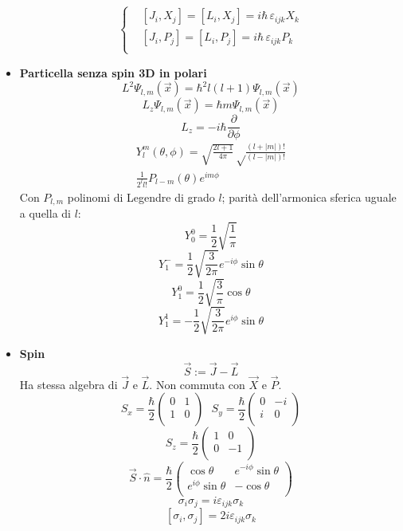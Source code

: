 \documentclass{article}
\begin{document}
\begin{small}
\begin{multicols*}{3}
\begin{itemize}[leftmargin=*]
		\[
			\left\{\begin{aligned}
				&\left[J_i, X_j\right] = \left[L_i,X_j\right] = i\hbar \,\varepsilon _{ijk} X_k\\
				&\left[J_i, P_j\right] = \left[L_i,P_j\right] = i\hbar \,\varepsilon _{ijk} P_k\\
			\end{aligned}\right.
		\]
	\item \textbf{Particella senza spin 3D in polari}
		\[L^2 \Psi _{l,m}(\vec{x}) = \hbar ^2 l(l+1) \Psi _{l,m}(\vec{x})\]
		\[L_z \Psi _{l,m}(\vec{x}) = \hbar m \Psi _{l,m}(\vec{x})\]
		\[L_z = -i\hbar \frac{\partial}{\partial \phi }\]
		\begin{align*}Y_l^m(\theta ,\phi ) = \sqrt{\frac{2l+1}{4\pi }}\sqrt\frac{(l+|m|)!}{\left(l-|m|\right)!}\\\frac{1}{2^ll!}P_{l-m}(\theta ) e^{im\phi }\end{align*}
		Con $P_{l,m}$ polinomi di Legendre di grado $l$; parità dell'armonica sferica uguale a quella di $l$:
		\[Y_0^0 = \frac{1}{2}\sqrt{\frac{1}{\pi }}\]
		\[Y_1^- = \frac{1}{2}\sqrt{\frac{3}{2\pi }}e^{-i\phi }\sin\theta \]
		\[Y_1^0 = \frac{1}{2}\sqrt{\frac{3}{\pi }}\cos\theta \]
		\[Y_1^1 = -\frac{1}{2}\sqrt{\frac{3}{2\pi }} e^{i\phi }\sin\theta \]
	\item \textbf{Spin}
		\[\vec{S} := \vec{J}-\vec{L}\]
		Ha stessa algebra di $\vec{J}$ e $\vec{L}$. Non commuta con $\vec{X}$ e $\vec{P}$.
		\[S_x = \frac{\hbar }{2}
			\begin{pmatrix}
				0&1\\
				1&0\\
			\end{pmatrix}
			\hspace{8pt}
		S_y = \frac{\hbar }{2}
			\begin{pmatrix}
				0&-i\\
				i&0\\
			\end{pmatrix}
		\]
		\[S_z = \frac{\hbar }{2}
			\begin{pmatrix}
				1&0\\
				0&-1\\
			\end{pmatrix}
		\]
		\[\vec{S}\cdot \hat{n} = \frac{\hbar }{2} \begin{pmatrix}
			\cos\theta & e^{-i\phi }\sin\theta \\
			e^{i\phi }\sin\theta & -\cos\theta \\
		\end{pmatrix}\]
		\[\sigma _i\sigma _j = i\varepsilon _{ijk}\sigma _k\]
		\[\left[\sigma _i,\sigma _j\right] = 2i\varepsilon _{ijk}\sigma _k\]


\end{itemize}
\end{multicols*}
\end{small}
\end{document}
